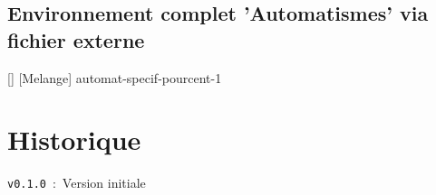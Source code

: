 \documentclass[french,11pt,a4paper]{article}
\def\AutomatEnonce{%
L'opération qui permet de calculer $25\,\%$ de 480 est :
}
\def\AutomatReponses{%
	{$\dfrac{480}{25 \times 100}$} ,
	{$25 \times 480 \times 0,1$} ,
	{$\dfrac{480 \times 100}{25}$} ,
	{$\dfrac{1}{4} \times 480$}
}
\begin{document}
\pagebreak

\subsection{Environnement complet 'Automatismes' via fichier externe}

\begin{codehigh}[language=latex/latex2]
\def\AutomatEnonce{%
  L'opération qui permet de calculer $25\,\%$ de 480 est :
}
\def\AutomatReponses{%
  {$\dfrac{480}{25 \times 100}$} ,
  {$25 \times 480 \times 0,1$} ,
  {$\dfrac{480 \times 100}{25}$} ,
  {$\dfrac{1}{4} \times 480$}
}
\end{codehigh}

\begin{demohigh}[language=latex/latex2]
  []                              %
  [Melange]                       %
  {automat-specif-pourcent-1}     %
\end{demohigh}

\pagebreak

\section{Historique}

\verb|v0.1.0|~:~Version initiale
\end{document}
